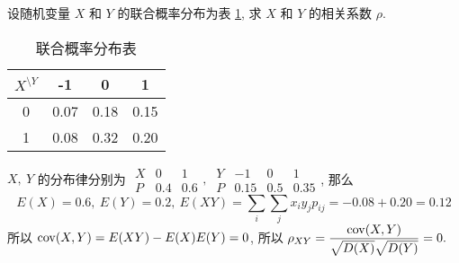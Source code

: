 \begin{example}
    设随机变量 $X$ 和 $Y$ 的联合概率分布为表 \ref{-101007018}, 求 $X$ 和 $Y$ 的相关系数 $\rho.$
\end{example}
\begin{solution}
    \begin{minipage}{0.3\linewidth}
        \begin{table}[H]
            \centering
            \caption*{联合概率分布表}
            \label{-101007018}
            \begin{tabular}{c | c c c}
                $X^{\displaystyle\setminus Y}$ & -1   & 0    & 1    \\
                \midrule
                0                              & 0.07 & 0.18 & 0.15 \\
                1                              & 0.08 & 0.32 & 0.20
            \end{tabular}
        \end{table}
    \end{minipage}\hfill
    \begin{minipage}{0.66\linewidth}
        $X,~Y$ 的分布律分别为 $\begin{array}{c|cc}
                X & 0   & 1   \\\hline
                P & 0.4 & 0.6
            \end{array},~\begin{array}{c|ccc}
                Y & -1   & 0   & 1    \\\hline
                P & 0.15 & 0.5 & 0.35
            \end{array}$, 那么
        $$E(X)=0.6,~E(Y)=0.2,~E(XY)=\sum_i\sum_j x_iy_j p_{ij}=-0.08+0.20=0.12$$
        所以 $\mathrm{cov}(X,Y)=E(XY)-E(X)E(Y)=0$, 所以 $\rho_{XY}=\dfrac{\mathrm{cov}(X,Y)}{\sqrt{D(X)}\sqrt{D(Y)}}=0.$
    \end{minipage}
\end{solution}

